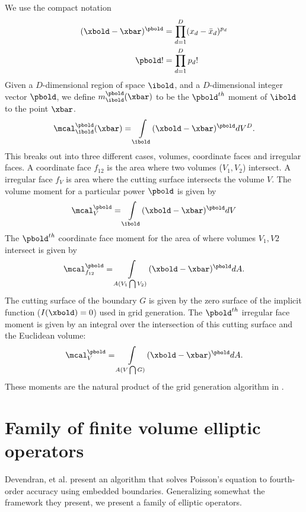 \documentclass{article}
\begin{document}
We use the compact notation
\begin{align*}
(\xbold - \xbar)^\pbold &= \prod\limits^D_{d=1} (x_d - {\bar x}_d)^{p_d} \\
\pbold! &= \prod\limits^D_{d = 1} p_d!
\end{align*}
Given a $D$-dimensional region of space $\ibold$, 
and a $D$-dimensional integer vector
$\pbold$, we define $m_\ibold^\pbold(\xbar)$ to be the $\pbold^{th}$
moment of $\ibold$ to the point $\xbar$.
\begin{equation}
\mcal_\ibold^\pbold(\xbar)  =  \int\limits_{\ibold} (\xbold - \xbar)^\pbold dV^D.
\label{eqn::volmoment}
\end{equation}
This breaks out into three different cases, volumes, coordinate faces
and irregular faces.
A coordinate face $f_{12}$  is the area where two
volumes ($V_1, V_2$) intersect.
A irregular face $f_V$  is area where the cutting surface
intersects the volume $V$.
The volume moment for a particular power $\pbold$  is
given by
\begin{equation}
  \mcal^\pbold_V = \int\limits_{\ibold} (\xbold - \xbar)^\pbold dV
  \label{eqn::volmom}
\end{equation}
The $\pbold^{th}$ coordinate face moment for the area of where volumes $V_1, V2$
intersect is given by
\begin{equation}
  \mcal^\pbold_{f_{12}} = \int\limits_{A(V_1\bigcap V_2)} (\xbold - \xbar)^\pbold dA.
  \label{eqn::facmom}
\end{equation}
The cutting surface of the boundary $G$ is given by  the zero
surface of the  implicit function ($I(\xbold)= 0$) used in grid generation.
The $\pbold^{th}$ irregular face moment is given by an integral over
the intersection of this cutting surface and the Euclidean volume:
\begin{equation}
  \mcal^\pbold_V = \int\limits_{A(V \bigcap G)} (\xbold - \xbar)^\pbold dA.
  \label{eqn::irrmom}
\end{equation}
These moments are the natural product of the grid generation algorithm
in \cite{Schwartz2015}.


\section{Family of finite volume elliptic operators}

Devendran, et al. \cite{Devendran2017} present an algorithm that
solves Poisson's equation to fourth-order accuracy using embedded
boundaries.  Generalizing somewhat  the framework they present, we
present a family of elliptic operators.
\end{document}

